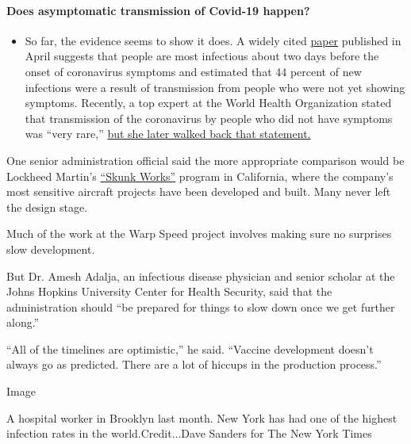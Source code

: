 \begin{itemize}
{  \paragraph{Does asymptomatic transmission of Covid-19
  happen?}\label{does-asymptomatic-transmission-of-covid-19-happen}}

  \begin{itemize}
  \tightlist
  \item
    So far, the evidence seems to show it does. A widely cited
    \href{https://www.nature.com/articles/s41591-020-0869-5}{paper}
    published in April suggests that people are most infectious about
    two days before the onset of coronavirus symptoms and estimated that
    44 percent of new infections were a result of transmission from
    people who were not yet showing symptoms. Recently, a top expert at
    the World Health Organization stated that transmission of the
    coronavirus by people who did not have symptoms was ``very rare,''
    \href{https://www.nytimes.com/2020/06/09/world/coronavirus-updates.html?action=click\&pgtype=Article\&state=default\&region=MAIN_CONTENT_3\&context=storylines_faq\#link-1f302e21}{but
    she later walked back that statement.}
  \end{itemize}
\end{itemize}

One senior administration official said the more appropriate comparison
would be Lockheed Martin's
\href{https://www.nytimes.com/1990/12/05/business/business-people-lockheeds-skunk-works-appoints-engineermanager.html}{``Skunk
Works''} program in California, where the company's most sensitive
aircraft projects have been developed and built. Many never left the
design stage.

Much of the work at the Warp Speed project involves making sure no
surprises slow development.

But Dr. Amesh Adalja, an infectious disease physician and senior scholar
at the Johns Hopkins University Center for Health Security, said that
the administration should ``be prepared for things to slow down once we
get further along.''

``All of the timelines are optimistic,'' he said. ``Vaccine development
doesn't always go as predicted. There are a lot of hiccups in the
production process.''

Image

A hospital worker in Brooklyn last month. New York has had one of the
highest infection rates in the world.Credit...Dave Sanders for The New
York Times

